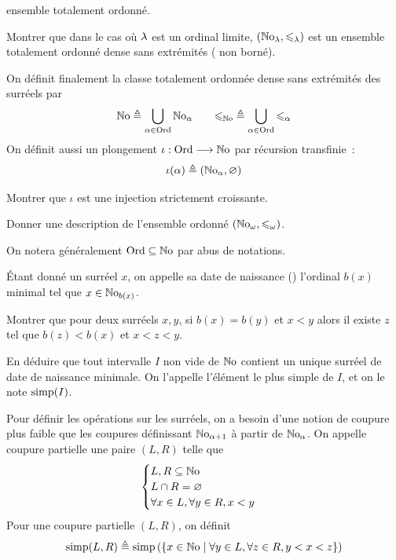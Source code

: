 \begin{problem}
\begin{pbQuest}
    ensemble totalement ordonné.
  \item Montrer que dans le cas où $\lambda$ est un ordinal limite,
    $(\mathbb{N}\mathrm{o}_{\lambda},\leqslant_{\lambda})$ est un ensemble totalement ordonné dense sans
    extrémités ( non borné).
  \end{pbQuest}
  On définit finalement la classe totalement ordonnée dense sans extrémités des
  surréels par
  \[\mathbb{N}\mathrm{o} \triangleq \bigcup_{\alpha \in \operatorname{Ord}} \mathbb{N}\mathrm{o}_{\alpha}\qquad
  \mathord{\leqslant_{\mathbb{N}\mathrm{o}}}\triangleq \bigcup_{\alpha\in\operatorname{Ord}} \mathord{\leqslant_{\alpha}}\]
  On définit aussi un plongement $\iota : \displaystyle \operatorname{Ord} \longrightarrow \mathbb{N}\mathrm{o}$ par
  récursion transfinie~:
  \[\iota(\alpha) \triangleq (\mathbb{N}\mathrm{o}_{\alpha},\varnothing)\]
  \begin{pbQuest}[resume]
  \item Montrer que $\iota$ est une injection strictement croissante.
  \item Donner une description de l'ensemble ordonné $(\mathbb{N}\mathrm{o}_{\omega},\leqslant_{\omega})$.
  \end{pbQuest}
  On notera généralement $\operatorname{Ord}\subseteq\mathbb{N}\mathrm{o}$ par abus de notations.

  \'Etant donné un surréel $x$, on appelle sa date de naissance
  () l'ordinal $b(x)$ minimal tel que $x \in \mathbb{N}\mathrm{o}_{b(x)}$.
  \begin{pbQuest}[resume]
  \item Montrer que pour deux surréels $x,y$, si $b(x) = b(y)$ et $x < y$ alors
    il existe $z$ tel que $b(z) < b(x)$ et $x < z < y$.
  \item En déduire que tout intervalle $I$ non vide de $\mathbb{N}\mathrm{o}$ contient un
    unique surréel de date de naissance minimale. On l'appelle l'élément le plus
    simple de $I$, et on le note $\operatorname{simp}(I)$.
  \end{pbQuest}


  Pour définir les opérations sur les surréels, on a besoin d'une notion de
  coupure plus faible que les coupures définissant $\mathbb{N}\mathrm{o}_{\alpha+1}$ à partir de
  $\mathbb{N}\mathrm{o}_{\alpha}$. On appelle coupure partielle une paire $(L,R)$ telle que
  \[\begin{cases}
  L,R\subseteq \mathbb{N}\mathrm{o}\\
  L\cap R = \varnothing\\
  \forall x \in L, \forall y \in R, x < y
  \end{cases}\]
  Pour une coupure partielle $(L,R)$, on définit
  \[\operatorname{simp}(L,R)\triangleq \operatorname{simp}\left(
  \left\{ x \in \mathbb{N}\mathrm{o} \;\middle\vert\; \forall y \in L, \forall z \in R, y < x < z \right\}\right)\]
  

\end{problem}

